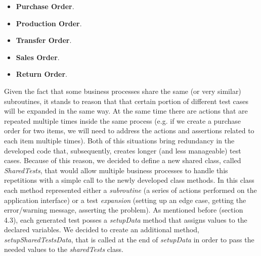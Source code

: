 \begin{itemize}
    \item \textbf{Purchase Order}.
    \item \textbf{Production Order}.
    \item \textbf{Transfer Order}.
    \item \textbf{Sales Order}. 
    \item \textbf{Return Order}.
\end{itemize}

Given the fact that some business processes share the same (or very similar) subroutines, it stands to reason that that certain portion of different test cases will be expanded in the same way. At the same time there are actions that are repeated multiple times inside the same process (e.g. if we create a purchase order for two items, we will need to address the actions and assertions related to each item multiple times). Both of this situations bring redundancy in the developed code that, subsequently, creates longer (and less manageable) test cases. Because of this reason, we decided to define a new shared class, called \textit{SharedTests}, that would allow multiple business processes to handle this repetitions with a simple call to the newly developed class methods. In this class each method represented either a \textit{subroutine} (a series of actions performed on the application interface) or a test \textit{expansion} (setting up an edge case, getting the error/warning message, asserting the problem). As mentioned before (section 4.3), each generated test posses a \textit{setupData} method that assigns values to the declared variables. We decided to create an additional method, \textit{setupSharedTestsData}, that is called at the end of \textit{setupData} in order to pass the needed values to the \textit{sharedTests} class. 


